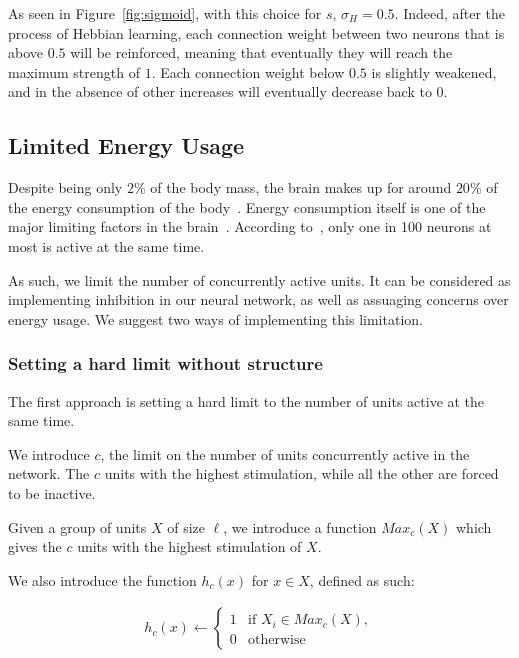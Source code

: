\documentclass[journal]{IEEEtran}
\begin{document}
As seen in Figure~\ref{fig:sigmoid}, with this choice for $s$, $\sigma_H = 0.5$. Indeed, after the process of Hebbian learning, each connection weight between two neurons that is above $0.5$ will be reinforced, meaning that eventually they will reach the maximum strength of $1$. Each connection weight below $0.5$ is slightly weakened, and in the absence of other increases will eventually decrease back to $0$.

\subsection{Limited Energy Usage}

Despite being only $2\%$ of the body mass, the brain makes up for around $20\%$ of the energy consumption of the body~\cite{lennie2003cost}. Energy consumption itself is one of the major limiting factors in the brain~\cite{attwell2001energy, lennie2003cost}. According to~\cite{attwell2001energy}, only one in 100 neurons at most is active at the same time. 

As such, we limit the number of concurrently active units. It can be considered as implementing inhibition in our neural network, as well as assuaging concerns over energy usage. We suggest two ways of implementing this limitation.

\subsubsection{Setting a hard limit without structure}

The first approach is setting a hard limit to the number of units active at the same time.

We introduce $c$, the limit on the number of units concurrently active in the network. The $c$ units with the highest stimulation, while all the other are forced to be inactive.

Given a group of units $X$ of size $\ell$, we introduce a function $Max_c(X)$ which gives the $c$ units with the highest stimulation of $X$.

We also introduce the function $h_c(x)$ for $x \in X$, defined as such:

\begin{equation}
\begin{split}
h_c(x) \leftarrow \left\{\begin{array}{ll} 1 & \mbox {if } X_i \in Max_c(X), \\
 0 & \mbox {otherwise}\end{array}\right.
\end{split}
\end{equation}
\end{document}
